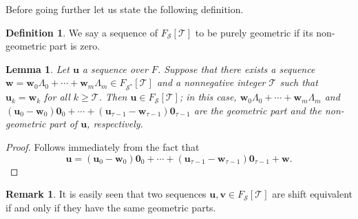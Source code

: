 \documentclass[12pt]{amsart}
\newtheorem{lem}[thrm]{Lemma}
\theoremstyle{definition}
\newtheorem{definition}[thrm]{Definition}
\newtheorem{remark}[thrm]{Remark}
\numberwithin{equation}{section}
\numberwithin{equation}{section}
\begin{document}
Before going further let us state the following definition.
\begin{definition} We say a sequence of $F_{\mathcal{S}}[\mathcal{T}]$ to be purely geometric if its non-geometric part is zero.
\end{definition}
\begin{lem}\label{lem 33} Let $\pmb{u}$ a sequence over $F$. Suppose that there exists a sequence $\pmb{w}=\pmb{w}_{0}\Lambda_{0} + \cdots + \pmb{w}_{m}\Lambda_{m}\in F_{\mathcal{S}^{\ast}}[\mathcal{T}]$ and a nonnegative integer $\mathcal{T}$ such that $\pmb{u}_{k}=\pmb{w}_{k}$ for all $k\geq \mathcal{T}$. Then $\pmb{u}\in F_{\mathcal{S}}[\mathcal{T}]$; in this case, $\pmb{w}_{0}\Lambda_{0} + \cdots + \pmb{w}_{m}\Lambda_{m}$ and $(\pmb{u}_{0}-\pmb{w}_{0})\pmb{0}_{0}+\cdots+(\pmb{u}_{\tau-1}-\pmb{w}_{\tau-1})\pmb{0}_{\tau-1}$ are the geometric part and the non-geometric part of $\pmb{u}$, respectively.
\end{lem}
\begin{proof} Follows immediately from the fact that $$\pmb{u}=(\pmb{u}_{0}-\pmb{w}_{0})\pmb{0}_{0}+\cdots+(\pmb{u}_{\tau-1}-\pmb{w}_{\tau-1})\pmb{0}_{\tau-1}+\pmb{w}.$$
\end{proof}
\begin{remark}
It is easily seen that two sequences $\pmb{u}, \pmb{v}\in F_{\mathcal{S}}[\mathcal{T}]$ are shift equivalent if and only if they have the same geometric parts.
\end{remark}
\end{document}
